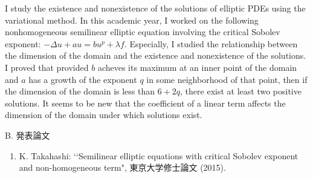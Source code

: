 \documentclass[a4j,twocolumn]{jarticle}
\begin{document}
\vspace{0.5cm}

I study the existence and nonexistence of the solutions
of elliptic PDEs using the variational method.
In this academic year, I worked on the following
nonhomogeneous semilinear elliptic equation
involving the critical Sobolev exponent:
$-\Delta u + a u = b u^p + \lambda f$. Especially, I studied
the relationship between the dimension of the domain and
the existence and nonexistence of the solutions.
I proved that provided 
$b$ acheves its maximum at an inner point of the
domain and $a$ has a growth of the exponent $q$
in some neighborhood of that point, then
if the dimension of the domain is less than $6 + 2q$,
there exist at least two positive solutions.
It seems to be new that the coefficient of a linear term affects
the dimension of the domain under which solutions exist.

\vspace{0.2cm}


\noindent
B. 発表論文

\vspace{0.1cm}

\begin{enumerate}
\item K. Takahashi: \lq\lq Semilinear elliptic equations with critical
      Sobolev exponent and non-homogeneous term",
      東京大学修士論文 (2015).
\end{enumerate}
\end{document}
